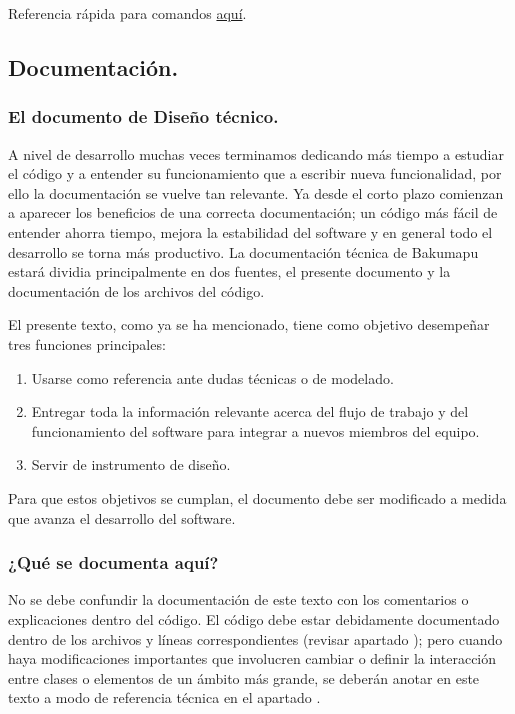 Referencia rápida para comandos  \href{https://rogerdudler.github.io/git-guide}{aquí}.





\subsection{Documentación.}

\subsubsection{El documento de Diseño técnico.}\label{flujo:documento-de-diseno}
A nivel de desarrollo muchas veces terminamos dedicando más tiempo a estudiar el código y a entender su funcionamiento que a escribir nueva funcionalidad, por ello la documentación se vuelve tan relevante. Ya desde el corto plazo comienzan a aparecer los beneficios de una correcta documentación; un código más fácil de entender ahorra tiempo, mejora la estabilidad del software y en general todo el desarrollo se torna más productivo. La documentación técnica de Bakumapu estará dividia principalmente en dos fuentes, el presente documento y la documentación de los archivos del código. 

El presente texto, como ya se ha mencionado, tiene como objetivo desempeñar tres funciones principales:
\begin{enumerate}[noitemsep]
	\item Usarse como referencia ante dudas técnicas o de modelado.
	\item Entregar toda la información relevante acerca del flujo de trabajo y del funcionamiento del software para integrar a nuevos miembros del equipo.
	\item Servir de instrumento de diseño.
\end{enumerate}

Para que estos objetivos se cumplan, el documento debe ser modificado a medida que avanza el desarrollo del software.

\subsubsection*{¿Qué se documenta aquí?}
No se debe confundir la documentación de este texto con los comentarios o explicaciones dentro del código. El código debe estar debidamente documentado dentro de los archivos y líneas correspondientes (revisar apartado ); pero cuando haya modificaciones importantes que involucren cambiar o definir la interacción entre clases o elementos de un ámbito más grande, se deberán anotar en este texto a modo de referencia técnica en el apartado .

